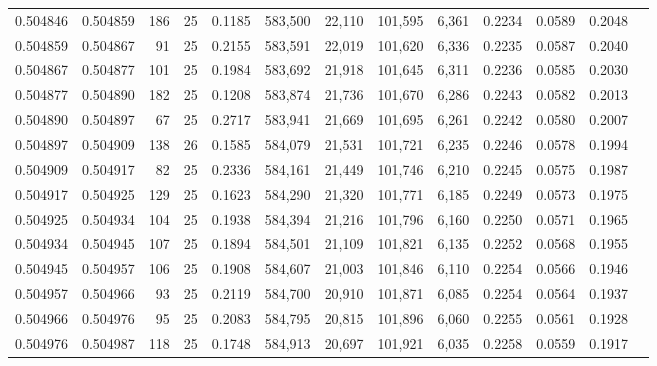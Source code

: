 \begin{tabular}{rrrrrrrrrrrrr}
0.504846 & 0.504859 & 186 &  25 &                                     0.1185 & 583,500 &  22,110 & 101,595 &   6,361 & 0.2234 & 0.0589 & 0.2048 \\
0.504859 & 0.504867 &  91 &  25 &                                     0.2155 & 583,591 &  22,019 & 101,620 &   6,336 & 0.2235 & 0.0587 & 0.2040 \\
0.504867 & 0.504877 & 101 &  25 &                                     0.1984 & 583,692 &  21,918 & 101,645 &   6,311 & 0.2236 & 0.0585 & 0.2030 \\
0.504877 & 0.504890 & 182 &  25 &                                     0.1208 & 583,874 &  21,736 & 101,670 &   6,286 & 0.2243 & 0.0582 & 0.2013 \\
0.504890 & 0.504897 &  67 &  25 &                                     0.2717 & 583,941 &  21,669 & 101,695 &   6,261 & 0.2242 & 0.0580 & 0.2007 \\
0.504897 & 0.504909 & 138 &  26 &                                     0.1585 & 584,079 &  21,531 & 101,721 &   6,235 & 0.2246 & 0.0578 & 0.1994 \\
0.504909 & 0.504917 &  82 &  25 &                                     0.2336 & 584,161 &  21,449 & 101,746 &   6,210 & 0.2245 & 0.0575 & 0.1987 \\
0.504917 & 0.504925 & 129 &  25 &                                     0.1623 & 584,290 &  21,320 & 101,771 &   6,185 & 0.2249 & 0.0573 & 0.1975 \\
0.504925 & 0.504934 & 104 &  25 &                                     0.1938 & 584,394 &  21,216 & 101,796 &   6,160 & 0.2250 & 0.0571 & 0.1965 \\
0.504934 & 0.504945 & 107 &  25 &                                     0.1894 & 584,501 &  21,109 & 101,821 &   6,135 & 0.2252 & 0.0568 & 0.1955 \\
0.504945 & 0.504957 & 106 &  25 &                                     0.1908 & 584,607 &  21,003 & 101,846 &   6,110 & 0.2254 & 0.0566 & 0.1946 \\
0.504957 & 0.504966 &  93 &  25 &                                     0.2119 & 584,700 &  20,910 & 101,871 &   6,085 & 0.2254 & 0.0564 & 0.1937 \\
0.504966 & 0.504976 &  95 &  25 &                                     0.2083 & 584,795 &  20,815 & 101,896 &   6,060 & 0.2255 & 0.0561 & 0.1928 \\
0.504976 & 0.504987 & 118 &  25 &                                     0.1748 & 584,913 &  20,697 & 101,921 &   6,035 & 0.2258 & 0.0559 & 0.1917 \\

\end{tabular}
